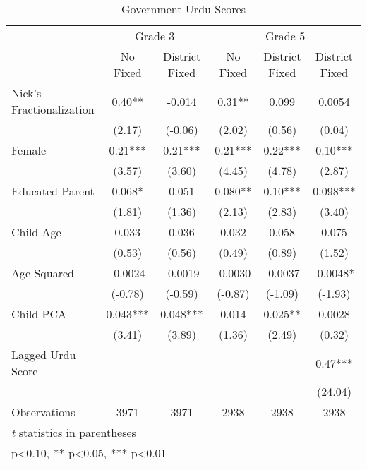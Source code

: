 \begin{table}[htbp]\centering
\def\sym#1{\ifmmode^{#1}\else\(^{#1}\)\fi}
\caption{Government Urdu Scores}
\begin{tabular}{l*{5}{c}}
\toprule
                &\multicolumn{2}{c}{Grade 3}&\multicolumn{3}{c}{Grade 5}           \\\cmidrule(lr){2-3}\cmidrule(lr){4-6}
                &\multicolumn{1}{c}{No Fixed}&\multicolumn{1}{c}{District Fixed}&\multicolumn{1}{c}{No Fixed}&\multicolumn{1}{c}{District Fixed}&\multicolumn{1}{c}{District Fixed}\\
\midrule
Nick's Fractionalization&     0.40** &   -0.014   &     0.31** &    0.099   &   0.0054   \\
                &   (2.17)   &  (-0.06)   &   (2.02)   &   (0.56)   &   (0.04)   \\
Female          &     0.21***&     0.21***&     0.21***&     0.22***&     0.10***\\
                &   (3.57)   &   (3.60)   &   (4.45)   &   (4.78)   &   (2.87)   \\
Educated Parent &    0.068*  &    0.051   &    0.080** &     0.10***&    0.098***\\
                &   (1.81)   &   (1.36)   &   (2.13)   &   (2.83)   &   (3.40)   \\
Child Age       &    0.033   &    0.036   &    0.032   &    0.058   &    0.075   \\
                &   (0.53)   &   (0.56)   &   (0.49)   &   (0.89)   &   (1.52)   \\
Age Squared     &  -0.0024   &  -0.0019   &  -0.0030   &  -0.0037   &  -0.0048*  \\
                &  (-0.78)   &  (-0.59)   &  (-0.87)   &  (-1.09)   &  (-1.93)   \\
Child PCA       &    0.043***&    0.048***&    0.014   &    0.025** &   0.0028   \\
                &   (3.41)   &   (3.89)   &   (1.36)   &   (2.49)   &   (0.32)   \\
Lagged Urdu Score&            &            &            &            &     0.47***\\
                &            &            &            &            &  (24.04)   \\
\midrule
Observations    &     3971   &     3971   &     2938   &     2938   &     2938   \\
\bottomrule
\multicolumn{6}{l}{\footnotesize \textit{t} statistics in parentheses}\\
\multicolumn{6}{l}{\footnotesize * p<0.10, ** p<0.05, *** p<0.01}\\
\end{tabular}
\end{table}

